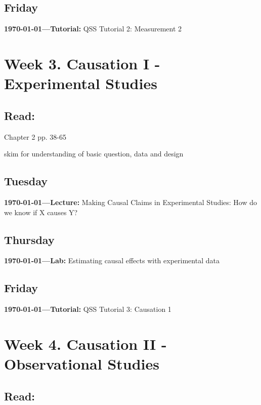 \subsection{Friday} \textbf{\today---Tutorial:} QSS Tutorial 2: Measurement 2
\AdvanceDate[4]



\vspace{2em}



\section{Week 3. Causation I - Experimental Studies}

\subsection{Read:}

\citet{Imai2022-pm} Chapter 2 pp. 38-65

\citet{Broockman2016-pi} skim for understanding of basic question, data and design



\subsection{Tuesday} \textbf{\today---Lecture:}  Making Causal Claims in Experimental Studies: How do we know if X causes Y?
\AdvanceDate[2]

\subsection{Thursday} \textbf{\today---Lab:} Estimating causal effects with experimental data
\AdvanceDate[1]
\subsection{Friday} \textbf{\today---Tutorial:} QSS Tutorial 3: Causation 1
\AdvanceDate[4]


\vspace{2em}

\section{Week 4. Causation II - Observational Studies}

\subsection{Read:}

